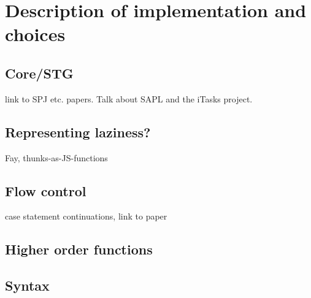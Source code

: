 \documentclass[11pt]{article}
\begin{document}
\pagebreak

\section{Description of implementation and choices}
\subsection{Core/STG}
link to SPJ etc. papers. Talk about SAPL and the iTasks project.

\subsection{Representing laziness?}
Fay, thunks-as-JS-functions

\subsection{Flow control}
case statement continuations, link to paper

\subsection{Higher order functions}

\subsection{Syntax}
\end{document}
